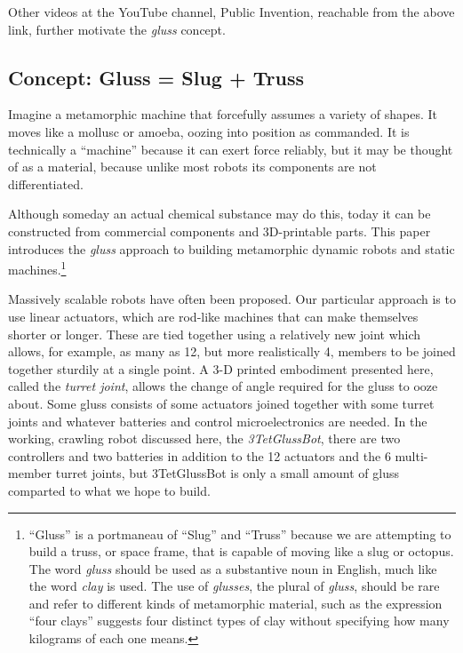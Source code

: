 \documentclass[11pt]{article}
\begin{document}
Other videos at the YouTube channel, Public Invention, reachable from the above link,
further motivate the \emph{gluss} concept.


\subsection{Concept: Gluss = Slug + Truss}

Imagine a metamorphic machine that forcefully assumes a variety of shapes. It moves like a mollusc or amoeba,
oozing into position as commanded. It is technically a ``machine'' because it can exert force reliably, but
it may be thought of as a material, because unlike most robots its components are not differentiated.

Although someday an actual chemical substance may do this, today it can be constructed from commercial components
and 3D-printable parts. This paper introduces the \emph{gluss} approach to building metamorphic dynamic robots
and static machines.\footnote{ ``Gluss'' is a portmaneau of ``Slug'' and ``Truss'' because we are attempting to
build a truss, or space frame, that is capable of moving like a slug or octopus.
The word \textit{gluss}
should be used as a substantive noun in English, much like the word \textit{clay} is used.
The use of \textit{glusses}, the plural
of \textit{gluss}, should be rare and refer to different kinds of metamorphic material, such as the expression
``four clays'' suggests four distinct types of clay without specifying how many kilograms of each one means.}

Massively scalable robots have often been proposed. Our particular approach is to use linear actuators,
which are rod-like machines that can make themselves shorter or longer. These are tied together using
a relatively new joint \cite{song2003spherical} which allows, for example, as many as 12, but more realistically 4,
members to be joined together sturdily at a single point.
A 3-D printed embodiment presented here, called the \emph{turret joint}, allows the
change of angle required for the gluss to ooze about. Some gluss consists of some actuators joined together
with some turret joints and whatever batteries and control microelectronics are needed. In the
working, crawling robot discussed here, the \emph{3TetGlussBot}, there are two controllers and two batteries
in addition to the 12 actuators and the 6 multi-member turret joints, but 3TetGlussBot is only
a small amount of gluss comparted to what we hope to build.
\end{document}
